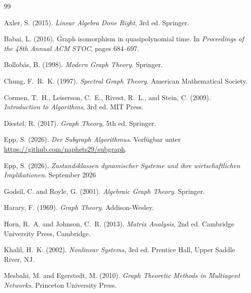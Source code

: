 \documentclass[12pt, a4paper]{article}
\theoremstyle{definition}
\theoremstyle{remark}
\begin{document}

\begin{thebibliography}{99}

Axler, S. (2015).
\newblock \textit{Linear Algebra Done Right}, 3rd ed.
\newblock Springer.

Babai, L. (2016).
\newblock Graph isomorphism in quasipolynomial time.
\newblock In \textit{Proceedings of the 48th Annual ACM STOC}, pages 684--697.

Bollobás, B. (1998).
\newblock \textit{Modern Graph Theory}.
\newblock Springer.

Chung, F.~R.~K. (1997).
\newblock \textit{Spectral Graph Theory}.
\newblock American Mathematical Society.

Cormen, T.~H., Leiserson, C.~E., Rivest, R.~L., and Stein, C. (2009).
\newblock \textit{Introduction to Algorithms}, 3rd ed.
\newblock MIT Press.

Diestel, R. (2017).
\newblock \textit{Graph Theory}, 5th ed.
\newblock Springer.

Epp, S. (2026).
\newblock \textit{Der Subgraph Algorithmus}. Verfügbar unter
\url{https://github.com/naphets29/subgraph}.

Epp, S. (2026).
\newblock \textit{Zustandsklassen dynamischer Systeme und ihre wirtschaftlichen
	Implikationen}. September 2026

Godsil, C. and Royle, G. (2001).
\newblock \textit{Algebraic Graph Theory}.
\newblock Springer.

Harary, F. (1969).
\newblock \textit{Graph Theory}.
\newblock Addison-Wesley.

Horn, R.~A. and Johnson, C.~R. (2013).
\newblock \textit{Matrix Analysis}, 2nd ed.
\newblock Cambridge University Press, Cambridge.

Khalil, H.~K. (2002).
\newblock \textit{Nonlinear Systems}, 3rd ed.
\newblock Prentice Hall, Upper Saddle River, NJ.

Mesbahi, M. and Egerstedt, M. (2010).
\newblock \textit{Graph Theoretic Methods in Multiagent Networks}.
\newblock Princeton University Press.


\end{thebibliography}
\end{document}
